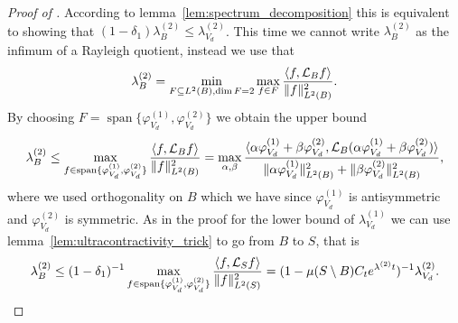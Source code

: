 \begin{proof}[Proof of ]
    According to lemma~\ref{lem:spectrum_decomposition} this is equivalent to showing that \( (1-\delta_1) \lambda^{(2)}_{B} \le \lambda^{(2)}_{V_d} \). This time we cannot write \( \lambda^{(2)}_{B} \) as the infimum of a Rayleigh quotient, instead we use that
    \begin{equation*}
        \lambda_B^{(2)} 
        = \min_{F \subseteq L^2(B), \dim F = 2}\max_{f \in F} \frac{\langle f, \mathcal{L}_B f \rangle}{\|f\|_{L^2(B)}^2}.
    \end{equation*}
    By choosing \( F = \operatorname{span}\{\varphi^{(1)}_{V_d}, \varphi^{(2)}_{V_d}\} \) we obtain the upper bound
    \begin{equation*}
        \lambda_B^{(2)}
        \le \max_{f \in \operatorname{span}\{\varphi^{(1)}_{V_d}, \varphi^{(2)}_{V_d}\}} \frac{\langle f, \mathcal{L}_{B} f \rangle}{\|f\|_{L^2(B)}^2}
        = \max_{\alpha, \beta} \frac{\langle \alpha \varphi^{(1)}_{V_d} + \beta \varphi^{(2)}_{V_d} , \mathcal{L}_{B} (\alpha \varphi^{(1)}_{V_d} + \beta \varphi^{(2)}_{V_d}) \rangle}{\|\alpha \varphi^{(1)}_{V_d}\|_{L^2(B)}^2 + \|\beta \varphi^{(2)}_{V_d}\|_{L^2(B)}^2},
    \end{equation*}
    where we used orthogonality on \( B \) which we have since \( \varphi^{(1)}_{V_d} \) is antisymmetric and \( \varphi^{(2)}_{V_d} \) is symmetric. 
    As in the proof for the lower bound of \( \lambda^{(1)}_{V_d} \) we can use lemma~\ref{lem:ultracontractivity_trick} to go from \( B \) to \( S \), that is
    \begin{equation*}
        \lambda_B^{(2)}
        \le (1-\delta_1)^{-1} \max_{f \in \operatorname{span}\{\varphi^{(1)}_{V_d}, \varphi^{(2)}_{V_d}\}} \frac{\langle f, \mathcal{L}_{S} f \rangle}{\|f\|_{L^2(S)}^2} = (1-\mu(S \setminus B)C_t e^{\lambda^{(2)} t})^{-1} \lambda^{(2)}_{V_d}.
    \end{equation*}
\end{proof}
